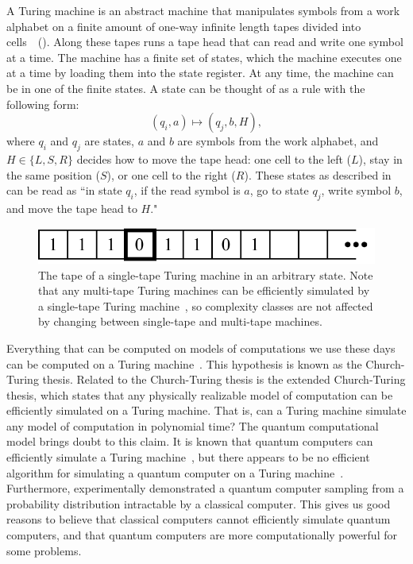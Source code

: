 A Turing machine is an abstract machine that manipulates symbols from a work alphabet on a finite amount of one-way infinite length tapes divided into cells~\cite{turing1937computable}~().
Along these tapes runs a tape head that can read and write one symbol at a time.
The machine has a finite set of states, which the machine executes one at a time by loading them into the state register.
At any time, the machine can be in one of the finite states.
A state can be thought of as a rule with the following form:
\begin{equation} \label{eqn:turing-state}
(q_i,a) \mapsto (q_j,b,H),
\end{equation}
where $q_i$ and $q_j$ are states, $a$ and $b$ are symbols from the work alphabet, and $H \in \{L, S, R\}$ decides how to move the tape head: one cell to the left ($L$), stay in the same position ($S$), or one cell to the right ($R$).
These states as described in  can be read as ``in state $q_i$, if the read symbol is $a$, go to state $q_j$, write symbol $b$, and move the tape head to $H$."

\begin{figure}[ht]
    \centering
    \includegraphics[width=0.5\linewidth]{figures/single-tape-turing-machine.pdf}
    \caption[The tape of a single-tape Turing machine in an arbitrary state.]{The tape of a single-tape Turing machine in an arbitrary state. Note that any multi-tape Turing machines can be efficiently simulated by a single-tape Turing machine~\cite{hartmanis1965computational}, so complexity classes are not affected by changing between single-tape and multi-tape machines.}
    \label{fig:single-tape-turing-machine}
\end{figure}

Everything that can be computed on models of computations we use these days can be computed on a Turing machine~\cite{dershowitz2008natural}.
This hypothesis is known as the Church-Turing thesis.
Related to the Church-Turing thesis is the extended Church-Turing thesis, which states that any physically realizable model of computation can be efficiently simulated on a Turing machine.
That is, can a Turing machine simulate any model of computation in polynomial time?
The quantum computational model brings doubt to this claim.
It is known that quantum computers can efficiently simulate a Turing machine~\cite{bennett1973logical}, but there appears to be no efficient algorithm for simulating a quantum computer on a Turing machine~\cite{deutsch1985quantum}.
Furthermore, \textcite{arute2019quantum} experimentally demonstrated a quantum computer sampling from a probability distribution intractable by a classical computer.
This gives us good reasons to believe that classical computers cannot efficiently simulate quantum computers, and that quantum computers are more computationally powerful for some problems.

